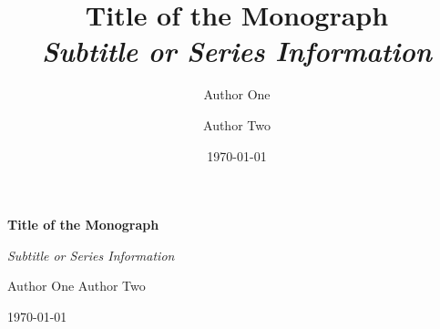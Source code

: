 \documentclass[letterpaper,12pt,oneside,openany]{memoir}
\title{%
  \Huge\bfseries Title of the Monograph\\[0.5cm]
  \Large\itshape Subtitle or Series Information%
}
\author{Author One \and Author Two}
\date{\today}
\begin{document}
\frontmatter

\begin{titlingpage}
  \centering
  \vspace*{4cm}
  {\Huge\bfseries Title of the Monograph\par}
  \vspace{1cm}
  {\Large\itshape Subtitle or Series Information\par}
  \vspace{3cm}
  {\large Author One \quad Author Two\par}
  \vfill
  {\large \today\par}
\end{titlingpage}

\tableofcontents*
\clearpage

\mainmatter






\backmatter

\clearpage
{}
{}


\end{document}
